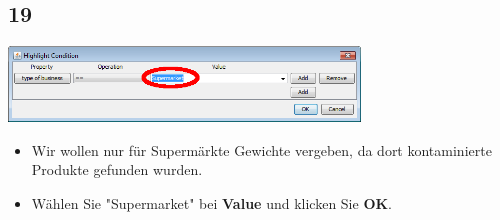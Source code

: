 \documentclass{beamer}
\begin{document}
\subsection{19}
\begin{frame}
	\begin{center}
  		\includegraphics[width=0.7\textwidth]{19.png}
	\end{center}
	\begin{itemize}
		\item Wir wollen nur für Supermärkte Gewichte vergeben, da dort kontaminierte Produkte gefunden wurden.
		\item Wählen Sie "Supermarket" bei \textbf{Value} und klicken Sie \textbf{OK}.		
	\end{itemize}
\end{frame}
\end{document}
